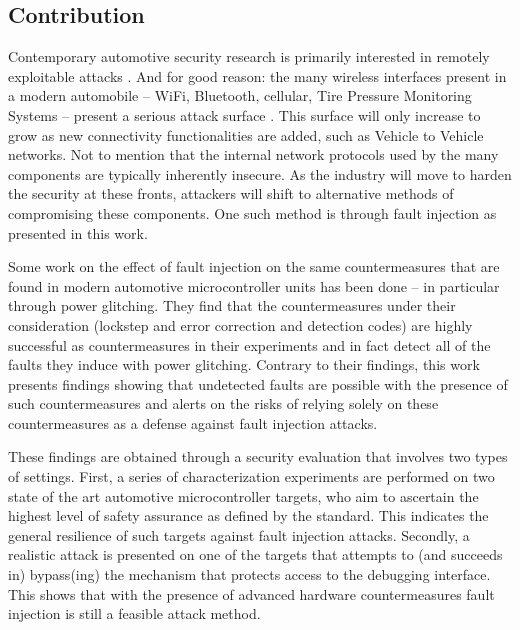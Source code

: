 \documentclass[10pt]{article}
\begin{document}
  \newpage
  \subsection{Contribution}

    Contemporary automotive security research is primarily interested in remotely exploitable attacks \cite{checkoway_comprehensive_2011}. And for good reason: the many wireless interfaces present in a modern automobile -- WiFi, Bluetooth, cellular, Tire Pressure Monitoring Systems -- present a serious attack surface \cite{brians_cyber_2016,smith_car_2016}. This surface will only increase to grow as new connectivity functionalities are added, such as Vehicle to Vehicle networks. Not to mention that the internal network protocols used by the many components are typically inherently insecure. 
    As the industry will move to harden the security at these fronts, attackers will shift to alternative methods of compromising these components. One such method is through fault injection as presented in this work. 

    Some work \cite{kanekawa_fault_1998,tummeltshammer_power_2009} on the effect of fault injection on the same countermeasures that are found in modern automotive microcontroller units has been done -- in particular through power glitching. They find that the countermeasures under their consideration (lockstep and error correction and detection codes) are highly successful as countermeasures in their experiments and in fact detect all of the faults they induce with power glitching. Contrary to their findings, this work presents findings showing that undetected faults are possible with the presence of such countermeasures and alerts on the risks of relying solely on these countermeasures as a defense against fault injection attacks.

    These findings are obtained through a security evaluation that involves two types of settings. 
    First, a series of characterization experiments are performed on two state of the art automotive microcontroller targets, who aim to ascertain the highest level of safety assurance as defined by the \citet{iso26262} standard. This indicates the general resilience of such targets against fault injection attacks. Secondly, a realistic attack is presented on one of the targets that attempts to (and succeeds in) bypass(ing) the mechanism that protects access to the debugging interface. This shows that with the presence of advanced hardware countermeasures fault injection is still a feasible attack method. 
\end{document}
